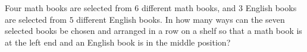 Four math books are selected from $6$ different math books, and $3$ English books are selected from $5$ different English books. In how many ways can the seven selected books be chosen and arranged in a row on a shelf so that a math book is at the left end and an English book is in the middle position?

